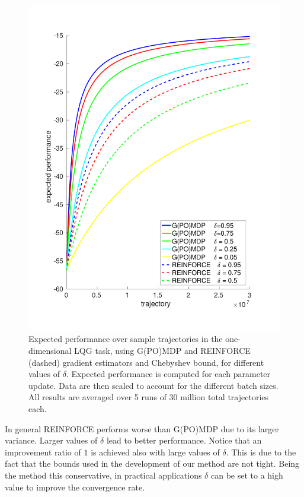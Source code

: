 \begin{figure}[h!]
\includegraphics[width = \textwidth]{Images/chebyshev.pdf}
\caption[Expected performance over sample trajectories in the one-dimensional LQG task for different gradient estimators ad values of $\delta$.]{Expected performance over sample trajectories in the one-dimensional \ac{LQG} task, using G(PO)MDP and REINFORCE (dashed) gradient estimators and Chebyshev bound, for different values of $\delta$. Expected performance is computed for each parameter update. Data are then scaled to account for the different batch sizes. All results are averaged over 5 runs of 30 million total trajectories each.}
\label{fig:1}
\end{figure}

In general REINFORCE performs worse than G(PO)MDP due to its larger variance.
Larger values of $\delta$  lead to better performance. Notice that an improvement ratio of $1$ is achieved also with large values of $\delta$. This is due to the fact that the bounds used in the development of our method are not tight. Being the method this conservative, in practical applications $\delta$ can be set to a high value to improve the convergence rate.

